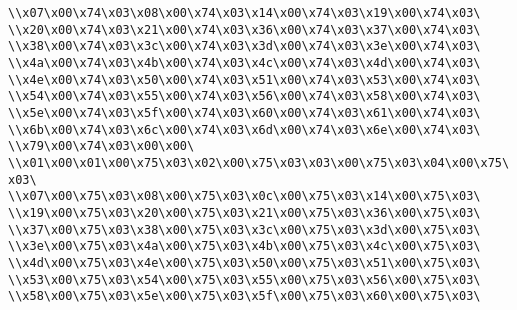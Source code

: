 \verb|\\x07\x00\x74\x03\x08\x00\x74\x03\x14\x00\x74\x03\x19\x00\x74\x03\|\newline
\verb|\\x20\x00\x74\x03\x21\x00\x74\x03\x36\x00\x74\x03\x37\x00\x74\x03\|\newline
\verb|\\x38\x00\x74\x03\x3c\x00\x74\x03\x3d\x00\x74\x03\x3e\x00\x74\x03\|\newline
\verb|\\x4a\x00\x74\x03\x4b\x00\x74\x03\x4c\x00\x74\x03\x4d\x00\x74\x03\|\newline
\verb|\\x4e\x00\x74\x03\x50\x00\x74\x03\x51\x00\x74\x03\x53\x00\x74\x03\|\newline
\verb|\\x54\x00\x74\x03\x55\x00\x74\x03\x56\x00\x74\x03\x58\x00\x74\x03\|\newline
\verb|\\x5e\x00\x74\x03\x5f\x00\x74\x03\x60\x00\x74\x03\x61\x00\x74\x03\|\newline
\verb|\\x6b\x00\x74\x03\x6c\x00\x74\x03\x6d\x00\x74\x03\x6e\x00\x74\x03\|\newline
\verb|\\x79\x00\x74\x03\x00\x00\|\newline
\verb|\\x01\x00\x01\x00\x75\x03\x02\x00\x75\x03\x03\x00\x75\x03\x04\x00\x75\x03\|\newline
\verb|\\x07\x00\x75\x03\x08\x00\x75\x03\x0c\x00\x75\x03\x14\x00\x75\x03\|\newline
\verb|\\x19\x00\x75\x03\x20\x00\x75\x03\x21\x00\x75\x03\x36\x00\x75\x03\|\newline
\verb|\\x37\x00\x75\x03\x38\x00\x75\x03\x3c\x00\x75\x03\x3d\x00\x75\x03\|\newline
\verb|\\x3e\x00\x75\x03\x4a\x00\x75\x03\x4b\x00\x75\x03\x4c\x00\x75\x03\|\newline
\verb|\\x4d\x00\x75\x03\x4e\x00\x75\x03\x50\x00\x75\x03\x51\x00\x75\x03\|\newline
\verb|\\x53\x00\x75\x03\x54\x00\x75\x03\x55\x00\x75\x03\x56\x00\x75\x03\|\newline
\verb|\\x58\x00\x75\x03\x5e\x00\x75\x03\x5f\x00\x75\x03\x60\x00\x75\x03\|\newline
